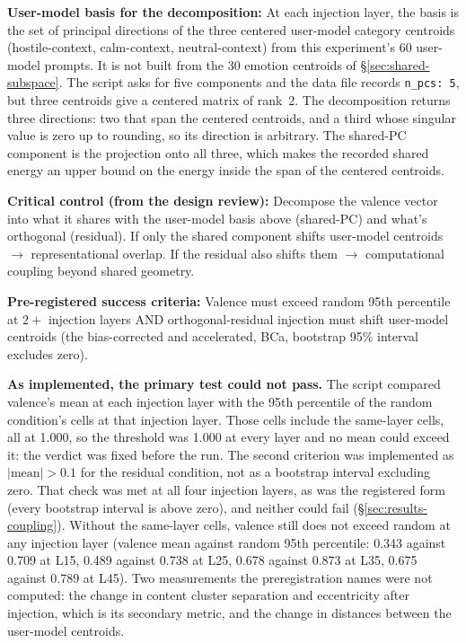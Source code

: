 \documentclass[11pt,a4paper]{article}
\begin{document}
\textbf{User-model basis for the decomposition:} At each injection layer, the basis is the set of principal directions of the three centered user-model category centroids (hostile-context, calm-context, neutral-context) from this experiment's 60 user-model prompts. It is not built from the 30 emotion centroids of \S\ref{sec:shared-subspace}. The script asks for five components and the data file records \texttt{n\_pcs: 5}, but three centroids give a centered matrix of rank~2. The decomposition returns three directions: two that span the centered centroids, and a third whose singular value is zero up to rounding, so its direction is arbitrary. The shared-PC component is the projection onto all three, which makes the recorded shared energy an upper bound on the energy inside the span of the centered centroids.

\textbf{Critical control (from the design review):} Decompose the valence vector into what it shares with the user-model basis above (shared-PC) and what's orthogonal (residual). If only the shared component shifts user-model centroids $\to$ representational overlap. If the residual also shifts them $\to$ computational coupling beyond shared geometry.

\textbf{Pre-registered success criteria:} Valence must exceed random 95th percentile at $2+$ injection layers AND orthogonal-residual injection must shift user-model centroids (the bias-corrected and accelerated, BCa, bootstrap 95\% interval excludes zero).

\textbf{As implemented, the primary test could not pass.} The script compared valence's mean at each injection layer with the 95th percentile of the random condition's cells at that injection layer. Those cells include the same-layer cells, all at 1.000, so the threshold was 1.000 at every layer and no mean could exceed it: the verdict was fixed before the run. The second criterion was implemented as $|\text{mean}| > 0.1$ for the residual condition, not as a bootstrap interval excluding zero. That check was met at all four injection layers, as was the registered form (every bootstrap interval is above zero), and neither could fail (\S\ref{sec:results-coupling}). Without the same-layer cells, valence still does not exceed random at any injection layer (valence mean against random 95th percentile: 0.343 against 0.709 at L15, 0.489 against 0.738 at L25, 0.678 against 0.873 at L35, 0.675 against 0.789 at L45). Two measurements the preregistration names were not computed: the change in content cluster separation and eccentricity after injection, which is its secondary metric, and the change in distances between the user-model centroids.
\end{document}
